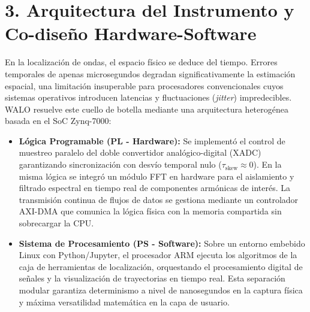 \documentclass[10.5pt,letterpaper]{article}
\begin{document}
\section*{3. Arquitectura del Instrumento y Co-diseño Hardware-Software}
En la localización de ondas, el espacio físico se deduce del tiempo. Errores temporales de apenas microsegundos degradan significativamente la estimación espacial, una limitación insuperable para procesadores convencionales cuyos sistemas operativos introducen latencias y fluctuaciones (\textit{jitter}) impredecibles. WALO resuelve este cuello de botella mediante una arquitectura heterogénea basada en el SoC Zynq-7000:
\begin{itemize}
    \item \textbf{Lógica Programable (PL - Hardware):} Se implementó el control de muestreo paralelo del doble convertidor analógico-digital (XADC) garantizando sincronización con desvío temporal nulo ($\tau_{\text{skew}} \approx 0$). En la misma lógica se integró un módulo FFT en hardware para el aislamiento y filtrado espectral en tiempo real de componentes armónicas de interés. La transmisión continua de flujos de datos se gestiona mediante un controlador AXI-DMA que comunica la lógica física con la memoria compartida sin sobrecargar la CPU.
    \item \textbf{Sistema de Procesamiento (PS - Software):} Sobre un entorno embebido Linux con Python/Jupyter, el procesador ARM ejecuta los algoritmos de la caja de herramientas de localización, orquestando el procesamiento digital de señales y la visualización de trayectorias en tiempo real. Esta separación modular garantiza determinismo a nivel de nanosegundos en la captura física y máxima versatilidad matemática en la capa de usuario.
\end{itemize}

\newpage %

\end{document}
